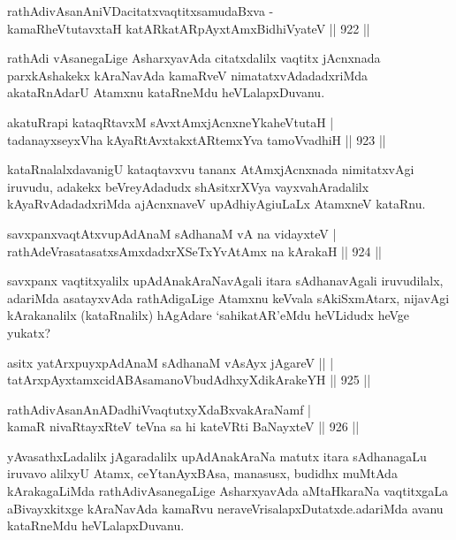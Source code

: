 \begin{shl}
rathAdivAsanAniVDacitatxvaqtitxsamudaBxva -\\
kamaRheVtutavxtaH katAR\s katAR\s pAyxtAmx\s BidhiVyateV \hfill||  922 ||  
\end{shl}

\begin{artha}
rathAdi vAsanegaLige AsharxyavAda citatxdalilx vaqtitx jAcnxnada parxkAshakekx kAraNavAda kamaRveV nimatatxvAdadadxriMda akataRnAdarU Atamxnu kataRneMdu heVLalapxDuvanu.
\end{artha}

\begin{shl}
akatuRrapi kataqRtavxM sAvxtAmxjAcnxneYkaheVtutaH | \\
tadanayxseyxVha kAyaRtAvxtakxtAR\s \s temxYva tamoVvadhiH \hfill||  923 ||  
\end{shl}

\begin{artha}
kataRnalalxdavanigU kataqtavxvu tananx AtAmxjAcnxnada nimitatxvAgi iruvudu, adakekx beVreyAdadudx shAsitxrXVya vayxvahAradalilx kAyaRvAdadadxriMda ajAcnxnaveV upAdhiyAgiuLaLx AtamxneV kataRnu.
\end{artha}

\begin{shl}
savxpanxvaqtAtxvupAdAnaM sAdhanaM vA na vidayxteV | \\
rathAdeVrasatasatxsAmxdadxrXSeTxYvA\s \s tAmx na kArakaH \hfill||  924 ||  
\end{shl}

\begin{artha}
savxpanx vaqtitxyalilx upAdAnakAraNavAgali itara sAdhanavAgali iruvudilalx, adariMda asatayxvAda rathAdigaLige Atamxnu keVvala sAkiSxmAtarx, nijavAgi kArakanalilx (kataRnalilx) hAgAdare `sahikatAR'eMdu heVLidudx heVge yukatx?
\end{artha}

\begin{shl}
asitx yatArxpuyxpAdAnaM sAdhanaM vA\s sAyx jAgareV ||  | \\
tatArxpAyxtamxcidABAsamanoVbudAdhxyXdikArakeYH \hfill||  925 ||  
\end{shl}
				
\begin{shl}
rathAdivAsanAnADadhiVvaqtutxyXdaBxvakAraNamf | \\
kamaR nivaRtayxRteV teVna sa hi kateVRti BaNayxteV \hfill||  926 ||  
\end{shl}

\begin{artha}
yAvasathxLadalilx jAgaradalilx upAdAnakAraNa matutx itara sAdhanagaLu iruvavo alilxyU Atamx, ceYtanAyxBAsa, manasusx, budidhx muMtAda kArakagaLiMda rathAdivAsanegaLige AsharxyavAda aMtaHkaraNa vaqtitxgaLa aBivayxkitxge kAraNavAda kamaRvu neraveVrisalapxDutatxde.adariMda avanu kataRneMdu heVLalapxDuvanu.
\end{artha}

